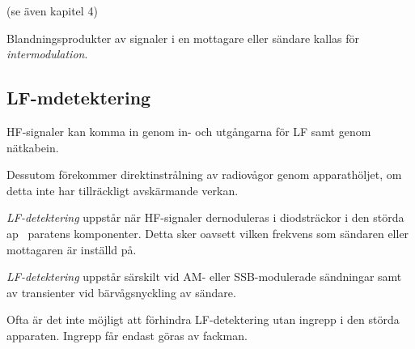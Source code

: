 (se även kapitel 4)

Blandningsprodukter av signaler i en mottagare eller sändare kallas
för \emph{intermodulation}.

\subsection{LF-mdetektering}

HF-signaler kan komma in genom in- och utgångarna för LF samt genom
nätkabein.

Dessutom förekommer direktinstrålning av radiovågor genom
apparathöljet, om detta inte har tillräckligt avskärmande verkan.

\emph{LF-detektering} uppstår när HF-signaler dernoduleras i
diodsträckor i den störda ap~ paratens komponenter. Detta sker oavsett
vilken frekvens som sändaren eller mottagaren är inställd på.

\emph{LF-detektering} uppstår särskilt vid AM- eller SSB-modulerade
sändningar samt av transienter vid bärvågsnyckling av sändare.

Ofta är det inte möjligt att förhindra LF-detektering utan ingrepp i
den störda apparaten. Ingrepp får endast göras av fackman.

